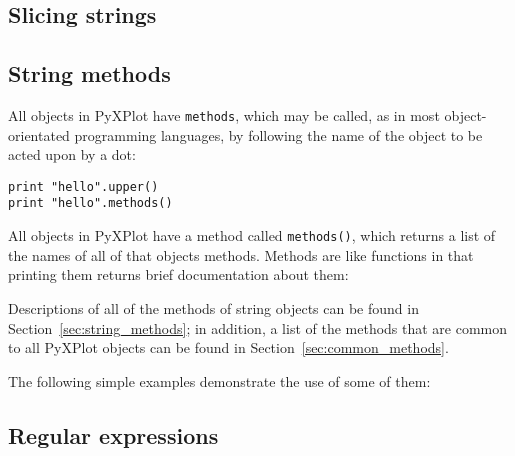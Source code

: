 \vspace{3mm}

\vspace{3mm}

\subsection{Slicing strings}



\subsection{String methods}

All objects in PyXPlot have {\tt methods}, which may be called, as in most object-orientated programming languages, by following the name of the object to be acted upon by a dot:

\begin{verbatim}
print "hello".upper()
print "hello".methods()
\end{verbatim}

\noindent All objects in PyXPlot have a method called {\tt methods()}, which returns a list of the names of all of that objects methods. Methods are like functions in that printing them returns brief documentation about them:

\vspace{3mm}

\vspace{3mm}

\noindent Descriptions of all of the methods of string objects can be found in Section~\ref{sec:string_methods}; in addition, a list of the methods that are common to all PyXPlot objects can be found in Section~\ref{sec:common_methods}.

The following simple examples demonstrate the use of some of them:

\vspace{3mm}

\vspace{3mm}

\vspace{3mm}

\vspace{3mm}

\subsection{Regular expressions}

